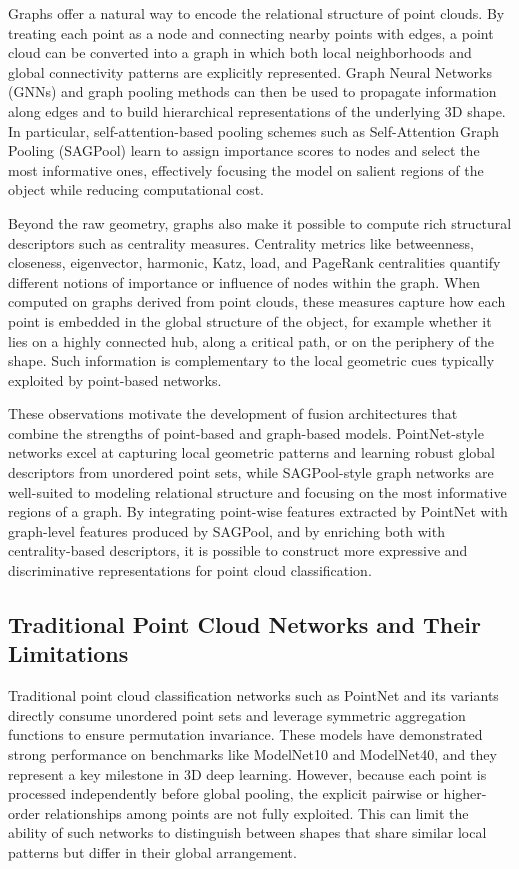 \documentclass[conference]{IEEEtran}
\begin{document}
Graphs offer a natural way to encode the relational structure of point clouds. By treating each point as a node and connecting nearby points with edges, a point cloud can be converted into a graph in which both local neighborhoods and global connectivity patterns are explicitly represented. Graph Neural Networks (GNNs) and graph pooling methods can then be used to propagate information along edges and to build hierarchical representations of the underlying 3D shape. In particular, self-attention-based pooling schemes such as Self-Attention Graph Pooling (SAGPool) learn to assign importance scores to nodes and select the most informative ones, effectively focusing the model on salient regions of the object while reducing computational cost.

Beyond the raw geometry, graphs also make it possible to compute rich structural descriptors such as centrality measures. Centrality metrics like betweenness, closeness, eigenvector, harmonic, Katz, load, and PageRank centralities quantify different notions of importance or influence of nodes within the graph. When computed on graphs derived from point clouds, these measures capture how each point is embedded in the global structure of the object, for example whether it lies on a highly connected hub, along a critical path, or on the periphery of the shape. Such information is complementary to the local geometric cues typically exploited by point-based networks.

These observations motivate the development of fusion architectures that combine the strengths of point-based and graph-based models. PointNet-style networks excel at capturing local geometric patterns and learning robust global descriptors from unordered point sets, while SAGPool-style graph networks are well-suited to modeling relational structure and focusing on the most informative regions of a graph. By integrating point-wise features extracted by PointNet with graph-level features produced by SAGPool, and by enriching both with centrality-based descriptors, it is possible to construct more expressive and discriminative representations for point cloud classification.

\subsection{Traditional Point Cloud Networks and Their Limitations}

Traditional point cloud classification networks such as PointNet and its variants directly consume unordered point sets and leverage symmetric aggregation functions to ensure permutation invariance. These models have demonstrated strong performance on benchmarks like ModelNet10 and ModelNet40, and they represent a key milestone in 3D deep learning. However, because each point is processed independently before global pooling, the explicit pairwise or higher-order relationships among points are not fully exploited. This can limit the ability of such networks to distinguish between shapes that share similar local patterns but differ in their global arrangement.
\end{document}
